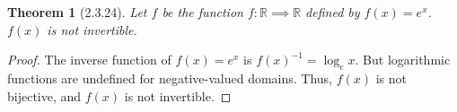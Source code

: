 \documentclass[a4paper, 12pt]{article}
\theoremstyle{plain}
\newtheorem*{theorem*}{Theorem}
\begin{document}
	
	\begin{theorem*}[2.3.24]
		Let $f$ be the function $f: \mathbb{R} \implies \mathbb{R}$ defined by 
		$f(x) = e^{x}$. $f(x)$ is not invertible.
	\end{theorem*}
	
	\begin{proof}
		The inverse function of $f(x) = e^{x}$ is $f(x)^{-1} = \log_{e}x$. But \newline 
		logarithmic functions are undefined for negative-valued domains. Thus, $f(x)$ is not 
		bijective, and $f(x)$ is not invertible.
	\end{proof}
\end{document}
